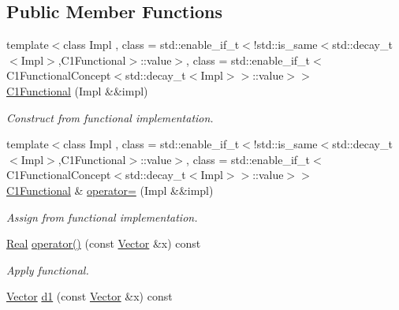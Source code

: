 \subsection*{Public Member Functions}
\begin{DoxyCompactItemize}
\item 
\hypertarget{classSpacy_1_1C1Functional_afeaa716a5bca483e2ff17bdb289ee8cf}{}{\footnotesize template$<$class Impl , class  = std\+::enable\+\_\+if\+\_\+t$<$!std\+::is\+\_\+same$<$std\+::decay\+\_\+t$<$\+Impl$>$,\+C1\+Functional$>$\+::value$>$, class  = std\+::enable\+\_\+if\+\_\+t$<$\+C1\+Functional\+Concept$<$std\+::decay\+\_\+t$<$\+Impl$>$$>$\+::value$>$$>$ }\\\hyperlink{classSpacy_1_1C1Functional_afeaa716a5bca483e2ff17bdb289ee8cf}{C1\+Functional} (Impl \&\&impl)\label{classSpacy_1_1C1Functional_afeaa716a5bca483e2ff17bdb289ee8cf}

\begin{DoxyCompactList}\small\item\em Construct from functional implementation. \end{DoxyCompactList}\item 
\hypertarget{classSpacy_1_1C1Functional_af83fad0494ef8fe62d039167e599bfbb}{}{\footnotesize template$<$class Impl , class  = std\+::enable\+\_\+if\+\_\+t$<$!std\+::is\+\_\+same$<$std\+::decay\+\_\+t$<$\+Impl$>$,\+C1\+Functional$>$\+::value$>$, class  = std\+::enable\+\_\+if\+\_\+t$<$\+C1\+Functional\+Concept$<$std\+::decay\+\_\+t$<$\+Impl$>$$>$\+::value$>$$>$ }\\\hyperlink{classSpacy_1_1C1Functional}{C1\+Functional} \& \hyperlink{classSpacy_1_1C1Functional_af83fad0494ef8fe62d039167e599bfbb}{operator=} (Impl \&\&impl)\label{classSpacy_1_1C1Functional_af83fad0494ef8fe62d039167e599bfbb}

\begin{DoxyCompactList}\small\item\em Assign from functional implementation. \end{DoxyCompactList}\item 
\hypertarget{classSpacy_1_1C1Functional_a621b710f0c8c583d074f4bf4da3cbb09}{}\hyperlink{classSpacy_1_1Real}{Real} \hyperlink{classSpacy_1_1C1Functional_a621b710f0c8c583d074f4bf4da3cbb09}{operator()} (const \hyperlink{classSpacy_1_1Vector}{Vector} \&x) const \label{classSpacy_1_1C1Functional_a621b710f0c8c583d074f4bf4da3cbb09}

\begin{DoxyCompactList}\small\item\em Apply functional. \end{DoxyCompactList}\item 
\hypertarget{classSpacy_1_1C1Functional_a5953291c58bf20e87ab2bfe26231fe49}{}\hyperlink{classSpacy_1_1Vector}{Vector} \hyperlink{classSpacy_1_1C1Functional_a5953291c58bf20e87ab2bfe26231fe49}{d1} (const \hyperlink{classSpacy_1_1Vector}{Vector} \&x) const \label{classSpacy_1_1C1Functional_a5953291c58bf20e87ab2bfe26231fe49}


\end{DoxyCompactItemize}
